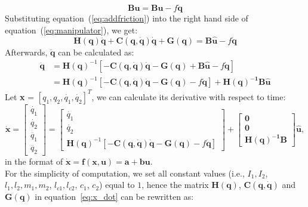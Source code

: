 \begin{equation} \label{eq:addfriction}
\mathbf {Bu} = \mathbf {B\hat{u}}-f \mathbf{\dot{q}}
\end{equation}
Substituting equation~(\ref{eq:addfriction}) into the right hand side of equation~(\ref{eq:manipulator}), we get:
\begin{equation}
\mathbf{H}(\mathbf q) \mathbf{\ddot{q}} +  \mathbf {C(q,\dot{q})} \mathbf{\dot{q}} + {\mathbf G}(\mathbf q) =  \mathbf {B\hat{u}}-f \mathbf{\dot{q}}
\end{equation}
Afterwards, $\mathbf{\ddot{q}}$ can be calculated as:
\begin{align}
\mathbf{\ddot{q}} &= \mathbf{H(q)}^{-1}[\mathbf{-C(q,\dot{q})\dot{q}-G(q)}+\mathbf {B\hat{u}}-f\mathbf{\dot{q}}] \nonumber \\
&= \mathbf{H(q)}^{-1}[-\mathbf{C(q,\dot{q})\dot{q}}-\mathbf{G(q)}-f\mathbf{\dot{q}}]+\mathbf{H(q)^{-1}B\hat{u}}
\end{align}
Let \textbf{x} = $[q_1, q_2, \dot{q_1}, \dot{q_2}]^T$, we can calculate its derivative with respect to time:
\begin{equation} \label{eq:x_dot}
\mathbf {\dot{x}} = \begin{bmatrix} \dot{q_1} \\ \dot{q_2} \\ \ddot{q_1} \\ \ddot{q_2} \end{bmatrix} = \begin{bmatrix} \dot{q_1} \\ \dot{q_2} \\ \mathbf{H(q)}^{-1}[-\mathbf{C(q,\dot{q})\dot{q}}-\mathbf{G(q)}-f\mathbf{\dot{q}}] \end{bmatrix} 
+ \begin{bmatrix} \mathbf 0 \\ \mathbf 0 \\ \mathbf{H(q)^{-1}B} \end{bmatrix} \mathbf{\hat{u}},
\end{equation}  in the format of 
$
\mathbf{\dot{x}} = \mathbf{f}(\mathbf{ x, u}) = \mathbf{a} + \mathbf {b u}
$. \\
\null \quad For the simplicity of computation, we set all constant values (i.e., $I_1, I_2$, $l_1, l_2, m_1, m_2$, $l_{c1}, l_{c2}$, $c_1$, $c_2$) equal to $1$, hence the matrix $\mathbf{H(q)}$, $\mathbf{C(q,\dot{q})}$ and $\mathbf{G(q)}$ in equation~\ref{eq:x_dot} can be rewritten as:
